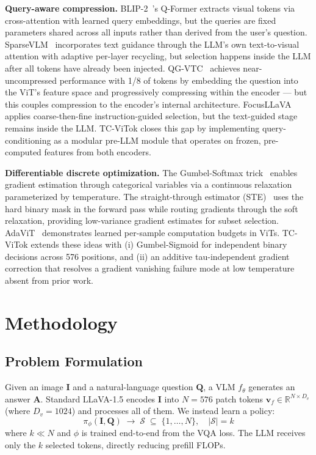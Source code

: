 \documentclass{article}
\newcommand{\vfine}{\mathbf{v}_{f}}
\begin{document}
\textbf{Query-aware compression.}
BLIP-2~\cite{li2023blip2}'s Q-Former extracts visual tokens via cross-attention with
learned query embeddings, but the queries are fixed parameters shared across all
inputs rather than derived from the user's question.
SparseVLM~\cite{zhang2025sparsevlm} incorporates text guidance through the LLM's own
text-to-visual attention with adaptive per-layer recycling, but selection happens inside
the LLM after all tokens have already been injected.
QG-VTC~\cite{li2025qgvtc} achieves near-uncompressed performance with 1/8 of tokens
by embedding the question into the ViT's feature space and progressively compressing
within the encoder — but this couples compression to the encoder's internal architecture.
FocusLLaVA~\cite{zhu2024focusllava} applies coarse-then-fine instruction-guided selection,
but the text-guided stage remains inside the LLM.
TC-ViTok closes this gap by implementing query-conditioning as a modular pre-LLM module
that operates on frozen, pre-computed features from both encoders.

\textbf{Differentiable discrete optimization.}
The Gumbel-Softmax trick~\cite{jang2017categorical, maddison2017concrete} enables
gradient estimation through categorical variables via a continuous relaxation parameterized
by temperature.
The straight-through estimator (STE)~\cite{bengio2013estimating} uses the hard binary
mask in the forward pass while routing gradients through the soft relaxation, providing
low-variance gradient estimates for subset selection.
AdaViT~\cite{meng2022adavit} demonstrates learned per-sample computation budgets in ViTs.
TC-ViTok extends these ideas with (i) Gumbel-Sigmoid for independent binary decisions
across 576 positions, and (ii) an additive tau-independent gradient correction that
resolves a gradient vanishing failure mode at low temperature absent from prior work.

\section{Methodology}
\label{sec:method}

\subsection{Problem Formulation}
\label{sec:prob}

Given an image $\mathbf{I}$ and a natural-language question $\mathbf{Q}$,
a VLM $f_\theta$ generates an answer $\mathbf{A}$.
Standard LLaVA-1.5 encodes $\mathbf{I}$ into $N=576$ patch tokens
$\vfine \in \mathbb{R}^{N \times D_v}$ (where $D_v=1024$) and processes all of them.
We instead learn a policy:
\[
  \pi_\phi(\mathbf{I}, \mathbf{Q}) \;\to\; \mathcal{S} \;\subseteq\; \{1, \ldots, N\},
  \quad |\mathcal{S}| = k
\]
where $k \ll N$ and $\phi$ is trained end-to-end from the VQA loss.
The LLM receives only the $k$ selected tokens, directly reducing prefill FLOPs.
\end{document}
